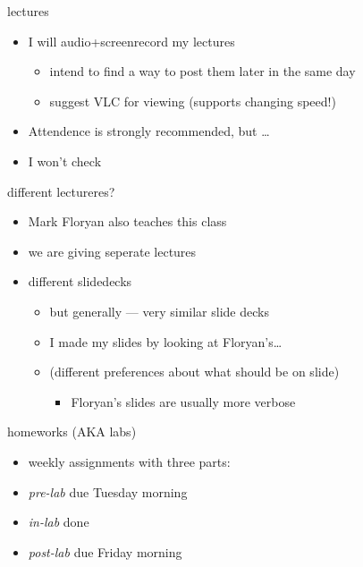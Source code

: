 \begin{frame}{lectures}
    \begin{itemize}
    \item I will audio+screenrecord my lectures
        \begin{itemize}
        \item intend to find a way to post them later in the same day
        \item suggest VLC for viewing (supports changing speed!)
        \end{itemize}
    \item Attendence is strongly recommended, but \ldots
    \item I won't check
    \end{itemize}
\end{frame}

\begin{frame}{different lectureres?}
    \begin{itemize}
    \item Mark Floryan also teaches this class
    \item we are giving seperate lectures
    \item different slidedecks
        \begin{itemize}
        \item but generally --- very similar slide decks
        \item I made my slides by looking at Floryan's\ldots
        \item (different preferences about what should be on slide)
            \begin{itemize}
            \item Floryan's slides are usually more verbose
            \end{itemize}
        \end{itemize}
    \end{itemize}
\end{frame}

\begin{frame}{homeworks (AKA labs)}
    \begin{itemize}
    \item weekly assignments with three parts:
    \vspace{.5cm}
    \item \textit{pre-lab} due Tuesday morning
    \item \textit{in-lab} done 
    \item \textit{post-lab} due Friday morning
    \end{itemize}
\end{frame}

